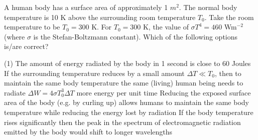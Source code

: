     \item A human body has a surface area of approximately 1 \( m^2 \). The normal body temperature is 10 K above the surrounding room temperature \( T_0 \). Take the room temperature to be \( T_0 = 300 \) K. For \( T_0 = 300 \) K, the value of \( \sigma T^4 = 460 \) Wm\(^{-2}\) (where \( \sigma \) is the Stefan-Boltzmann constant). Which of the following options is/are correct?
        \begin{tasks}(1)
            \task The amount of energy radiated by the body in 1 second is close to 60 Joules
            \task If the surrounding temperature reduces by a small amount \( \Delta T \ll T_0 \), then to maintain the same body temperature the same (living) human being needs to radiate \( \Delta W = 4 \sigma T_0^3 \Delta T \) more energy per unit time
            \task Reducing the exposed surface area of the body (e.g. by curling up) allows humans to maintain the same body temperature while reducing the energy lost by radiation
            \task If the body temperature rises significantly then the peak in the spectrum of electromagnetic radiation emitted by the body would shift to longer wavelengths
        \end{tasks}